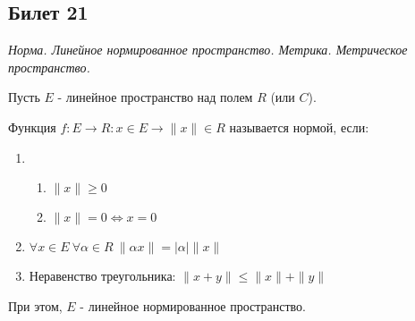 \subsection{Билет 21}

\textit{Норма. Линейное нормированное пространство. Метрика. Метрическое пространство.}

Пусть $E$ - линейное пространство над полем $R$ (или $C$). 

Функция $f:E\to R: x \in E \to \| x \| \in R$ называется нормой, если:
\begin{enumerate}
 \item \begin{enumerate}
        \item $\|x\| \ge 0$
        \item $\|x\| = 0 \Leftrightarrow x = 0$
       \end{enumerate}
 \item $\forall x \in E ~ \forall \alpha \in R ~ \|\alpha x \| = \left| \alpha \right| \|x\|$
 \item Неравенство треугольника: $\|x+y\| \le \|x\| + \|y\|$
\end{enumerate}

При этом, $E$ - линейное нормированное пространство.
